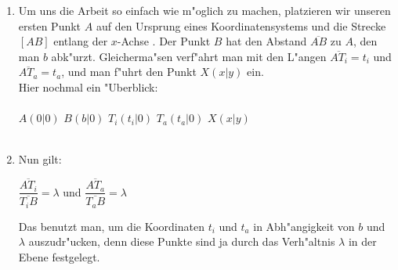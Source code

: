 \begin{small}
\begin{Beweis}
\begin{enumerate}
\item {Um uns die Arbeit so einfach wie m"oglich zu machen, platzieren wir unseren ersten Punkt $A$ auf den Ursprung eines Koordinatensystems und die Strecke $[AB]$ entlang der $x$-Achse . Der Punkt $B$ hat den Abstand $\overline{AB}$ zu $A$, den man $b$ abk"urzt. Gleicherma"sen verf"ahrt man mit den L"angen $\overline{AT_{i}}=t_{i}$ und $\overline{AT_{a}}= t_{a}$, und man f"uhrt den Punkt $X(x|y)$ ein.\\
Hier nochmal ein "Uberblick:\\
\\
\vartriangleright $A(0|0)$ \qquad \vartriangleright $B(b|0)$ \qquad \vartriangleright $T_{i}(t_{i}|0)$ \qquad \vartriangleright $T_{a}(t_{a}|0)$ \qquad \vartriangleright $X(x|y)$\\
\\}

\item {Nun gilt:
\begin{center}
$\dfrac{\overline{AT_{i}}}{\overline{T_{i}B}} = \lambda$ \qquad und \qquad $\dfrac{\overline{AT_{a}}}{\overline{T_{a}B}} = \lambda$ \\
\end{center}
Das benutzt man, um die Koordinaten $t_{i}$ und $t_{a}$ in Abh"angigkeit von $b$ und $\lambda$ auszudr"ucken, denn diese Punkte sind ja durch das Verh"altnis $\lambda$ in der Ebene festgelegt.\\

}
\end{enumerate}
\end{Beweis}
\end{small}
